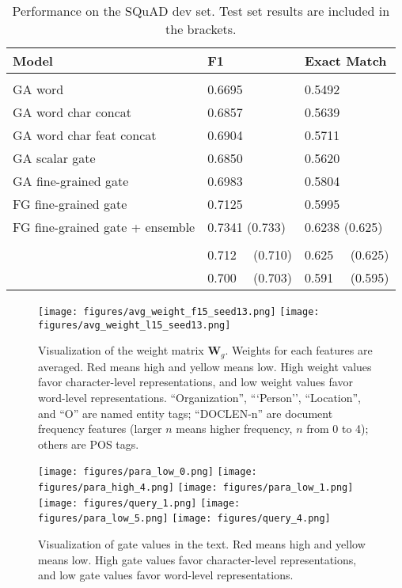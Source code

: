 \documentclass{article} \usepackage{iclr2017_conference,times}
\begin{document}
\begin{table}[t]
\caption{\small Performance on the SQuAD dev set. Test set results are included in the brackets.}
\label{tab:sq}
\begin{center}
\begin{tabular}{lll}
Model & F1 & Exact Match
\\ \hline \\
GA word & 0.6695 & 0.5492 \\
GA word char concat & 0.6857 & 0.5639 \\
GA word char feat concat & 0.6904 & 0.5711 \\
GA scalar gate & 0.6850 & 0.5620 \\
GA fine-grained gate & 0.6983 & 0.5804 \\
FG fine-grained gate & 0.7125 & 0.5995 \\
FG fine-grained gate + ensemble & 0.7341 (0.733) & 0.6238 (0.625) \\
\hline \\
\cite{yu2016chunk} & 0.712~~ (0.710) & 0.625~~ (0.625) \\
\cite{wang2016machine} & 0.700~~ (0.703) & 0.591~~ (0.595)
\end{tabular}
\end{center}
\end{table}

\begin{figure}[t]
\begin{center}
\texttt{[image: figures/avg\_weight\_f15\_seed13.png]} \vskip -0.05in
\texttt{[image: figures/avg\_weight\_l15\_seed13.png]}
\caption{\small Visualization of the weight matrix $\mathbf{W}_g$. Weights for each features are averaged. Red means high and yellow means low. High weight values favor character-level representations, and low weight values favor word-level representations. ``Organization'', ```Person'', ``Location'', and ``O'' are named entity tags; ``DOCLEN-n'' are document frequency features (larger $n$ means higher frequency, $n$ from 0 to 4); others are POS tags.}
\label{fig:avg_w}
\end{center}
\vspace{-0.2in}
\end{figure}


\begin{figure}[t]
\vspace{-0.1in}
\begin{center}
\texttt{[image: figures/para\_low\_0.png]}
\texttt{[image: figures/para\_high\_4.png]} \vskip -0.07in
\texttt{[image: figures/para\_low\_1.png]}
\texttt{[image: figures/query\_1.png]} \vskip -0.07in
\texttt{[image: figures/para\_low\_5.png]}
\texttt{[image: figures/query\_4.png]}
\caption{\small Visualization of gate values in the text. Red means high and yellow means low. High gate values favor character-level representations, and low gate values favor word-level representations.}
\label{fig:para}
\end{center}
\end{figure}
\end{document}
